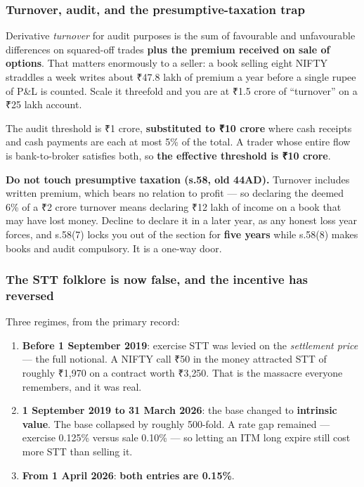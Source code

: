 \documentclass[11pt,a4paper]{article}
\newcommand{\rs}{₹}
\begin{document}
\subsubsection{Turnover, audit, and the presumptive-taxation trap}

Derivative \emph{turnover} for audit purposes is the sum of favourable and
unfavourable differences on squared-off trades \textbf{plus the premium received on
sale of options}. That matters enormously to a seller: a book selling eight NIFTY
straddles a week writes about \rs 47.8 lakh of premium a year before a single
rupee of P\&L is counted. Scale it threefold and you are at \rs 1.5 crore of
``turnover'' on a \rs 25 lakh account.

The audit threshold is \rs 1 crore, \textbf{substituted to \rs 10 crore} where
cash receipts and cash payments are each at most 5\% of the total. A trader whose
entire flow is bank-to-broker satisfies both, so \textbf{the effective threshold
is \rs 10 crore}.

\begin{waste}
\textbf{Do not touch presumptive taxation (s.58, old 44AD).} Turnover includes
written premium, which bears no relation to profit --- so declaring the deemed 6\%
of a \rs 2 crore turnover means declaring \rs 12 lakh of income on a book that may
have lost money. Decline to declare it in a later year, as any honest loss year
forces, and s.58(7) locks you out of the section for \textbf{five years} while
s.58(8) makes books and audit compulsory. It is a one-way door.
\end{waste}

\subsubsection{The STT folklore is now false, and the incentive has reversed}
\label{sec:stt}

Three regimes, from the primary record:

\begin{enumerate}
\item \textbf{Before 1 September 2019}: exercise STT was levied on the
\emph{settlement price} --- the full notional. A NIFTY call \rs 50 in the money
attracted STT of roughly \rs 1{,}970 on a contract worth \rs 3{,}250. That is the
massacre everyone remembers, and it was real.
\item \textbf{1 September 2019 to 31 March 2026}: the base changed to
\textbf{intrinsic value}. The base collapsed by roughly 500-fold. A rate gap
remained --- exercise 0.125\% versus sale 0.10\% --- so letting an ITM long expire
still cost more STT than selling it.
\item \textbf{From 1 April 2026}: \textbf{both entries are 0.15\%}.
\end{enumerate}
\end{document}
